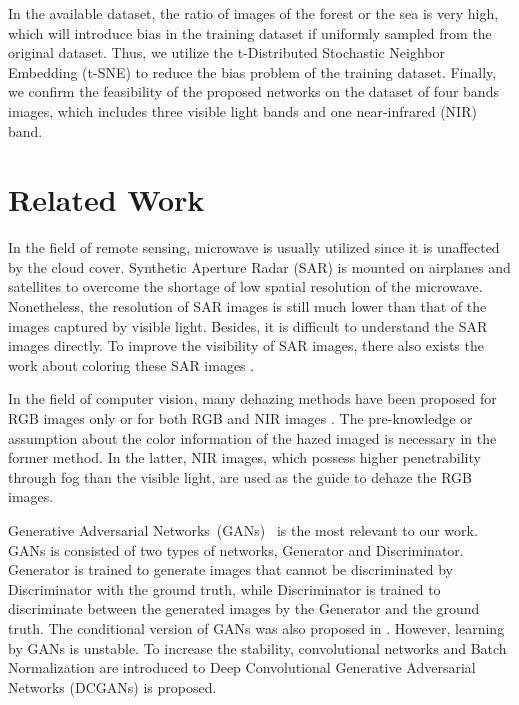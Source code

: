 \documentclass[10pt,twocolumn,letterpaper]{article}
\begin{document}
In the available dataset, the ratio of images of the forest or the sea is very high, which will introduce bias in the training dataset if uniformly sampled from the original dataset. Thus, we utilize the t-Distributed Stochastic Neighbor Embedding (t-SNE) \cite{maaten2008visualizing} to reduce the bias problem of the training dataset. Finally, we confirm the feasibility of the proposed networks on the dataset of four bands images, which includes three visible light bands and one near-infrared (NIR) band.

\section{Related Work}
In the field of remote sensing, microwave is usually utilized since it is unaffected by the cloud cover. Synthetic Aperture Radar (SAR) is mounted on airplanes and satellites to overcome the shortage of low spatial resolution of the microwave. Nonetheless, the resolution of SAR images is still much lower than that of the images captured by visible light. Besides, it is difficult to understand the SAR images directly. To improve the visibility of SAR images, there also exists the work about coloring these SAR images \cite{furuta_sar_color}. 

In the field of computer vision, many dehazing methods have been proposed for  RGB images only \cite{he2011single,berman2016non} or for both RGB and NIR  images \cite{schaul2009color,feng2013near,shibata2015unified}. The pre-knowledge or assumption about the color information of the hazed imaged is necessary in the former method. In the latter, NIR images, which possess higher penetrability through fog than the visible light, are used as the guide to dehaze the RGB images.

Generative Adversarial Networks~(GANs)~\cite{goodfellow2014generative} is the most relevant to our work. GANs is consisted of two types of networks, Generator and Discriminator. Generator is trained to generate images that cannot be discriminated by Discriminator with the ground truth, while Discriminator is trained to discriminate between the generated images by the Generator and the ground truth. The conditional version of GANs was also proposed in \cite{mirza2014conditional}. However, learning by GANs is unstable. To increase the stability, convolutional networks and  Batch Normalization  are introduced to Deep Convolutional Generative Adversarial Networks (DCGANs) \cite{radford2015unsupervised} is proposed.
\end{document}
